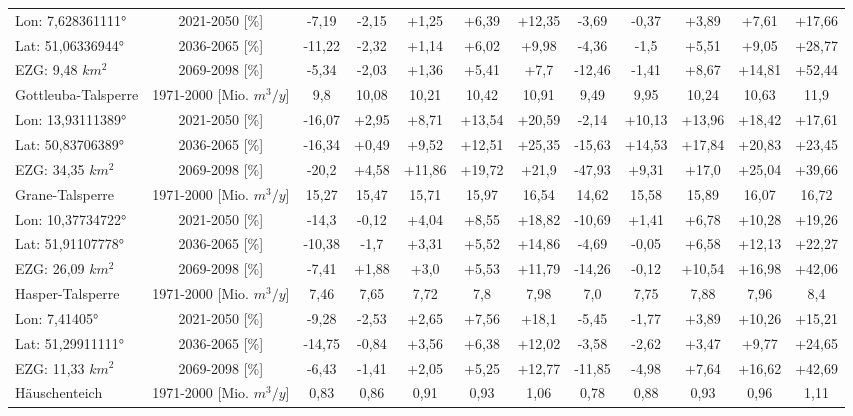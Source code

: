 \begin{longtable}{@{\extracolsep{\fill}}lc|ccccc||ccccc}
\cline{2-12} 
Lon: 7,628361111° & 2021-2050 [\%]  & -7,19 & -2,15 & +1,25 & +6,39 & +12,35 & -3,69 & -0,37 & +3,89 & +7,61 & +17,66\\ 
Lat: 51,06336944° & 2036-2065 [\%]  & -11,22 & -2,32 & +1,14 & +6,02 & +9,98 & -4,36 & -1,5 & +5,51 & +9,05 & +28,77\\ 
EZG: 9,48 $km^2$ & 2069-2098 [\%]  & -5,34 & -2,03 & +1,36 & +5,41 & +7,7 & -12,46 & -1,41 & +8,67 & +14,81 & +52,44\\ 
\hline 
Gottleuba-Talsperre & 1971-2000 [Mio. $m^3/y$]  & 9,8 & 10,08 & 10,21 & 10,42 & 10,91 & 9,49 & 9,95 & 10,24 & 10,63 & 11,9\\ 
\cline{2-12} 
Lon: 13,93111389° & 2021-2050 [\%]  & -16,07 & +2,95 & +8,71 & +13,54 & +20,59 & -2,14 & +10,13 & +13,96 & +18,42 & +17,61\\ 
Lat: 50,83706389° & 2036-2065 [\%]  & -16,34 & +0,49 & +9,52 & +12,51 & +25,35 & -15,63 & +14,53 & +17,84 & +20,83 & +23,45\\ 
EZG: 34,35 $km^2$ & 2069-2098 [\%]  & -20,2 & +4,58 & +11,86 & +19,72 & +21,9 & -47,93 & +9,31 & +17,0 & +25,04 & +39,66\\ 
\hline 
Grane-Talsperre & 1971-2000 [Mio. $m^3/y$]  & 15,27 & 15,47 & 15,71 & 15,97 & 16,54 & 14,62 & 15,58 & 15,89 & 16,07 & 16,72\\ 
\cline{2-12} 
Lon: 10,37734722° & 2021-2050 [\%]  & -14,3 & -0,12 & +4,04 & +8,55 & +18,82 & -10,69 & +1,41 & +6,78 & +10,28 & +19,26\\ 
Lat: 51,91107778° & 2036-2065 [\%]  & -10,38 & -1,7 & +3,31 & +5,52 & +14,86 & -4,69 & -0,05 & +6,58 & +12,13 & +22,27\\ 
EZG: 26,09 $km^2$ & 2069-2098 [\%]  & -7,41 & +1,88 & +3,0 & +5,53 & +11,79 & -14,26 & -0,12 & +10,54 & +16,98 & +42,06\\ 
\hline 
Hasper-Talsperre & 1971-2000 [Mio. $m^3/y$]  & 7,46 & 7,65 & 7,72 & 7,8 & 7,98 & 7,0 & 7,75 & 7,88 & 7,96 & 8,4\\ 
\cline{2-12} 
Lon: 7,41405° & 2021-2050 [\%]  & -9,28 & -2,53 & +2,65 & +7,56 & +18,1 & -5,45 & -1,77 & +3,89 & +10,26 & +15,21\\ 
Lat: 51,29911111° & 2036-2065 [\%]  & -14,75 & -0,84 & +3,56 & +6,38 & +12,02 & -3,58 & -2,62 & +3,47 & +9,77 & +24,65\\ 
EZG: 11,33 $km^2$ & 2069-2098 [\%]  & -6,43 & -1,41 & +2,05 & +5,25 & +12,77 & -11,85 & -4,98 & +7,64 & +16,62 & +42,69\\ 
\hline 
Häuschenteich & 1971-2000 [Mio. $m^3/y$]  & 0,83 & 0,86 & 0,91 & 0,93 & 1,06 & 0,78 & 0,88 & 0,93 & 0,96 & 1,11\\ 

\end{longtable}
